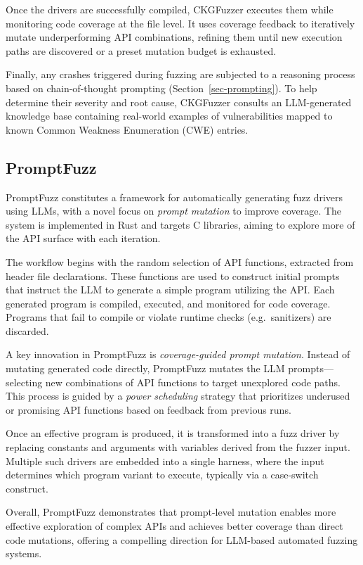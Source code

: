 \documentclass[
  a4paper,
]{scrreprt}
\theoremstyle{definition}
\theoremstyle{remark}
\begin{document}
Once the drivers are successfully compiled, CKGFuzzer executes them
while monitoring code coverage at the file level. It uses coverage
feedback to iteratively mutate underperforming API combinations,
refining them until new execution paths are discovered or a preset
mutation budget is exhausted.

Finally, any crashes triggered during fuzzing are subjected to a
reasoning process based on chain-of-thought prompting
(Section~\ref{sec-prompting}). To help determine their severity and root
cause, CKGFuzzer consults an LLM-generated knowledge base containing
real-world examples of vulnerabilities mapped to known Common Weakness
Enumeration (CWE) entries.

\subsection{PromptFuzz}\label{promptfuzz}

PromptFuzz \autocite{lyu2024} constitutes a framework for automatically
generating fuzz drivers using LLMs, with a novel focus on \emph{prompt
mutation} to improve coverage. The system is implemented in Rust and
targets C libraries, aiming to explore more of the API surface with each
iteration.

The workflow begins with the random selection of API functions,
extracted from header file declarations. These functions are used to
construct initial prompts that instruct the LLM to generate a simple
program utilizing the API. Each generated program is compiled, executed,
and monitored for code coverage. Programs that fail to compile or
violate runtime checks (e.g.~sanitizers) are discarded.

A key innovation in PromptFuzz is \emph{coverage-guided prompt
mutation}. Instead of mutating generated code directly, PromptFuzz
mutates the LLM prompts---selecting new combinations of API functions to
target unexplored code paths. This process is guided by a \emph{power
scheduling} strategy that prioritizes underused or promising API
functions based on feedback from previous runs.

Once an effective program is produced, it is transformed into a fuzz
driver by replacing constants and arguments with variables derived from
the fuzzer input. Multiple such drivers are embedded into a single
harness, where the input determines which program variant to execute,
typically via a case-switch construct.

Overall, PromptFuzz demonstrates that prompt-level mutation enables more
effective exploration of complex APIs and achieves better coverage than
direct code mutations, offering a compelling direction for LLM-based
automated fuzzing systems.
\end{document}
